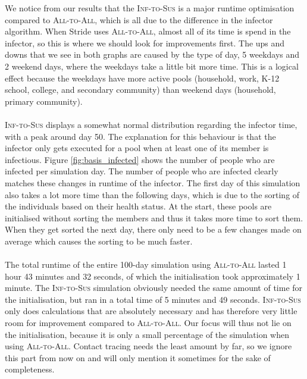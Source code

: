 We notice from our results that the \textsc{Inf-to-Sus} is a major runtime optimisation compared to \textsc{All-to-All}, which is all due to the difference in the infector algorithm. When Stride uses \textsc{All-to-All}, almost all of its time is spend in the infector, so this is where we should look for improvements first. The ups and downs that we see in both graphs are caused by the type of day, 5 weekdays and 2 weekend days, where the weekdays take a little bit more time. This is a logical effect because the weekdays have more active pools (household, work, K-12 school, college, and secondary community) than weekend days (household, primary community).
\\\\
\textsc{Inf-to-Sus} displays a somewhat normal distribution regarding the infector time, with a peak around day 50. The explanation for this behaviour is that the infector only gets executed for a pool when at least one of its member is infectious. Figure \ref{fig:basis_infected} shows the number of people who are infected per simulation day. The number of people who are infected clearly matches these changes in runtime of the infector. The first day of this simulation also takes a lot more time than the following days, which is due to the sorting of the individuals based on their health status. At the start, these pools are initialised without sorting the members and thus it takes more time to sort them. When they get sorted the next day, there only need to be a few changes made on average which causes the sorting to be much faster.
\\\\
The total runtime of the entire 100-day simulation using \textsc{All-to-All} lasted 1 hour 43 minutes and 32 seconds, of which the initialisation took approximately 1 minute. The \textsc{Inf-to-Sus} simulation obviously needed the same amount of time for the initialisation, but ran in a total time of 5 minutes and 49 seconds. \textsc{Inf-to-Sus} only does calculations that are absolutely necessary and has therefore very little room for improvement compared to \textsc{All-to-All}. Our focus will thus not lie on the initialisation, because it is only a small percentage of the simulation when using \textsc{All-to-All}. Contact tracing needs the least amount by far, so we ignore this part from now on and will only mention it sometimes for the sake of completeness.

